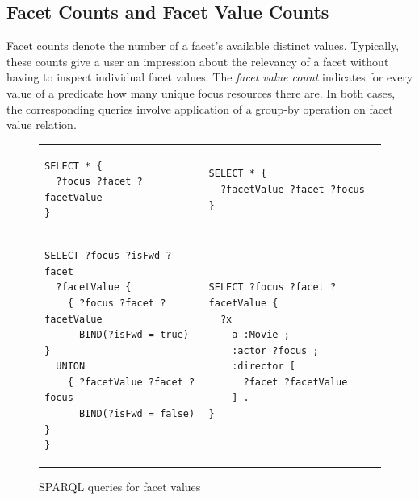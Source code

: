 \subsection{Facet Counts and Facet Value Counts}
Facet counts denote the number of a facet's available distinct values. Typically, these counts give a user an impression about the relevancy of a
facet without having to inspect individual facet values.
The \emph{facet value count} indicates for every value of a predicate
how many unique focus resources there are.
In both cases, the corresponding queries involve application of a group-by operation on facet
value relation.%







\begin{figure}
\centering
\bgroup
\def\arraystretch{1.5}
\begin{tabular}{m{8cm}m{8cm}}
\begin{lstlisting}[language=sparql, label=lst:simple-facet, linewidth=7cm, caption=Forward facets]
SELECT * {
  ?focus ?facet ?facetValue
}
\end{lstlisting}

&

\begin{lstlisting}[language=sparql, linewidth=7cm, caption=Backward facets]
SELECT * {
  ?facetValue ?facet ?focus
}
\end{lstlisting}

\\

\begin{lstlisting}[language=sparql, linewidth=7cm, caption=Union of both directions (not supported)]
SELECT ?focus ?isFwd ?facet
  ?facetValue {
    { ?focus ?facet ?facetValue
      BIND(?isFwd = true) }
  UNION
    { ?facetValue ?facet ?focus
      BIND(?isFwd = false) }   
}
\end{lstlisting}


&

\begin{lstlisting}[language=sparql, linewidth=7cm, caption=Example where the ?focus variable is in a different triple pattern than ?facet and ?facetValue.]
SELECT ?focus ?facet ?facetValue {
  ?x
    a :Movie ;
    :actor ?focus ;
    :director [
      ?facet ?facetValue
    ] .
}
\end{lstlisting}

\\

\end{tabular}
\egroup
\caption{SPARQL queries for facet values}
\label{fig:simple-facet-value}
\end{figure}




